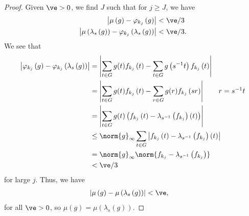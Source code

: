 \documentclass[10pt]{mypackage}
\begin{document}
\begin{proof}
  Given $\ve > 0$, we find $J$ such that for $j\geq J$, we have
  \begin{align*}
    \left\vert \mu\left(g\right) - \varphi_{k_j}\left(g\right) \right\vert &< \ve/3\\
    \left\vert \mu\left(\lambda_s\left(g\right)\right) - \varphi_{k_j}\left(\lambda_s\left(g\right)\right) \right\vert &< \ve/3.
  \end{align*}
  We see that
  \begin{align*}
    \left\vert \varphi_{k_j}\left(g\right) - \varphi_{k_j}\left(\lambda_s\left(g\right)\right) \right\vert &= \left\vert \sum_{t\in G}g(t)f_{k_j}\left(t\right) - \sum_{t\in G}g\left(s^{-1}t\right)f_{k_j}\left(t\right) \right\vert\\
                                                                                                           &= \left\vert \sum_{t\in G}g(t)f_{k_j}\left(t\right) - \sum_{r\in G}g(r)f_{k_j}\left(sr\right) \right\vert \tag*{$r = s^{-1}t$}\\
                                                                                                           &= \left\vert \sum_{t\in G}g(t)\left(f_{k_j}\left(t\right)-\lambda_{s^{-1}}\left(f_{k_j}\right)\left(t\right)\right) \right\vert\\
                                                                                                           &\leq \norm{g}_{\infty}\sum_{t\in G}\left\vert f_{k_j}\left(t\right) - \lambda_{s^{-1}}\left(f_{k_j}\right)\left(t\right) \right\vert\\
                                                                                                           &= \norm{g}_{\infty}\norm{f_{k_j} - \lambda_{s^{-1}}\left(f_{k_j}\right)}\\
                                                                                                           &< \ve/3
  \end{align*}
  for large $j$. Thus, we have
  \begin{align*}
    \left\vert \mu\left(g\right) - \mu\left(\lambda_{s}\left(g\right)\right) \right\vert &< \ve,
  \end{align*}
  for all $\ve > 0$, so $\mu\left(g\right) = \mu\left(\lambda_{s}\left(g\right)\right)$.
\end{proof}
\end{document}
